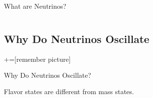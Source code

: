 \documentclass[9pt]{beamer}
\begin{document}
\begin{darkframes}
\begin{frame}{What are Neutrinos?}
\begin{minipage}[\textheight]{\textwidth}
\begin{columns}[T]
\begin{column}{0.4\textwidth}

      \end{column}


      \end{columns}
      \end{minipage}

    \end{frame}



\subsection{Why Do Neutrinos Oscillate}

+=[remember picture]

\everymath{\displaystyle}


\begin{frame}{Why Do Neutrinos Oscillate?}

Flavor states are different from mass states.


\end{frame}
\end{darkframes}
\end{document}
